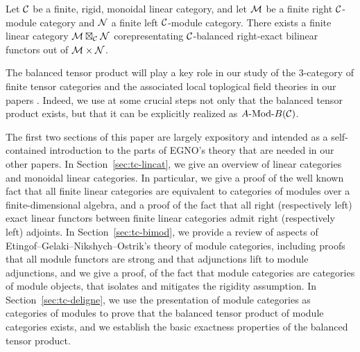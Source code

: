 \documentclass{amsart}
\begin{document}
\begin{theorem*}
Let $\mathcal C$ be a finite, rigid, monoidal linear category, and let $\mathcal M$ be a finite right $\mathcal C$-module category and $\mathcal N$ a finite left $\mathcal C$-module category.  There exists a finite linear category $\mathcal M \boxtimes_\mathcal C \mathcal N$ corepresentating $\mathcal C$-balanced right-exact bilinear functors out of $\mathcal M \times \mathcal N$.
\end{theorem*}

The balanced tensor product will play a key role in our study of the $3$-category of finite tensor categories and the associated local toplogical field theories in our papers \cite{3TC, DTCI}.  Indeed, we use at some crucial steps not only that the balanced tensor product exists, but that it can be explicitly realized as $\Mod{A}{B}(\cC)$.  

The first two sections of this paper are largely expository and intended as a self-contained introduction to the parts of EGNO's theory that are needed in our other papers.  In Section~\ref{sec:tc-lincat}, we give an overview of linear categories and monoidal linear categories.  In particular, we give a proof of the well known fact that all finite linear categories are equivalent to categories of modules over a finite-dimensional algebra, and a proof of the fact that all right (respectively left) exact linear functors between finite linear categories admit right (respectively left) adjoints.  In Section~\ref{sec:tc-bimod}, we provide a review of aspects of Etingof--Gelaki--Nikshych--Ostrik's theory of module categories, including proofs that all module functors are strong and that adjunctions lift to module adjunctions, and we give a proof, of the fact that module categories are categories of module objects, that isolates and mitigates the rigidity assumption.  In Section~\ref{sec:tc-deligne}, we use the presentation of module categories as categories of modules to prove that the balanced tensor product of module categories exists, and we establish the basic exactness properties of the balanced tensor product.


\end{document}
